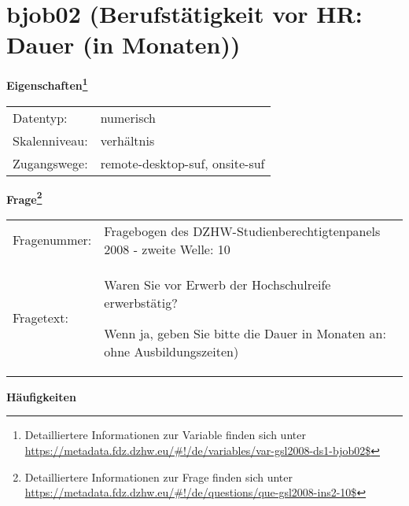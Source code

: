 
    \setcounter{footnote}{0}

    \vspace*{-1.8cm}
	\section{bjob02 (Berufstätigkeit vor HR: Dauer (in Monaten))}
	\label{section:bjob02}



    \vspace*{0.5cm}
    \noindent\textbf{Eigenschaften\footnote{Detailliertere Informationen zur Variable finden sich unter
		\url{https://metadata.fdz.dzhw.eu/\#!/de/variables/var-gsl2008-ds1-bjob02$}}}\\
	\begin{tabularx}{\hsize}{@{}lX}
	Datentyp: & numerisch \\
	Skalenniveau: & verhältnis \\
	Zugangswege: &
	  remote-desktop-suf, 
	  onsite-suf
 \\
    \end{tabularx}



				\vspace*{0.5cm}
                \noindent\textbf{Frage\footnote{Detailliertere Informationen zur Frage finden sich unter
		              \url{https://metadata.fdz.dzhw.eu/\#!/de/questions/que-gsl2008-ins2-10$}}}\\
				\begin{tabularx}{\hsize}{@{}lX}
					Fragenummer: &
					  Fragebogen des DZHW-Studienberechtigtenpanels 2008 - zweite Welle:
					  10
 \\
					Fragetext: & Waren Sie vor Erwerb der Hochschulreife erwerbstätig?\par  Wenn ja, geben Sie bitte die Dauer in Monaten an: ohne Ausbildungszeiten) \\
				\end{tabularx}





        		\vspace*{0.5cm}
                \noindent\textbf{Häufigkeiten}

